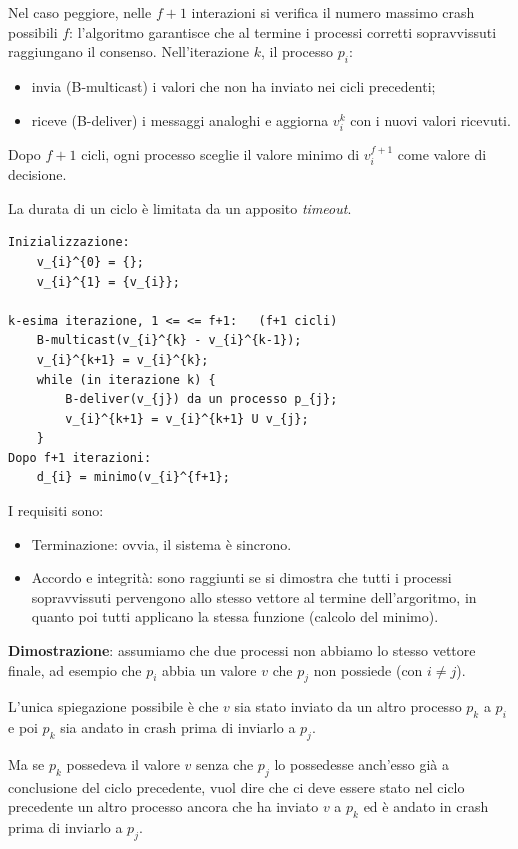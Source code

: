 Nel caso peggiore, nelle $f+1$ interazioni si verifica il numero massimo crash possibili $f$: l'algoritmo garantisce che al termine i processi corretti sopravvissuti raggiungano il consenso.
Nell'iterazione $k$, il processo $p_{i}$:
\begin{itemize}
    \item invia (B-multicast) i valori che non ha inviato nei cicli precedenti;
    \item riceve (B-deliver) i messaggi analoghi e aggiorna $v_{i}^{k}$ con i nuovi valori ricevuti.
\end{itemize}

Dopo $f+1$ cicli, ogni processo sceglie il valore minimo di $v_{i}^{f+1}$ come valore di decisione.

La durata di un ciclo è limitata da un apposito \textit{timeout}.

\vspace{5mm}

\begin{lstlisting}
Inizializzazione:
    v_{i}^{0} = {};
    v_{i}^{1} = {v_{i}};

k-esima iterazione, 1 <= <= f+1:   (f+1 cicli)
    B-multicast(v_{i}^{k} - v_{i}^{k-1});
    v_{i}^{k+1} = v_{i}^{k};
    while (in iterazione k) {
        B-deliver(v_{j}) da un processo p_{j};
        v_{i}^{k+1} = v_{i}^{k+1} U v_{j};
    }
Dopo f+1 iterazioni:
    d_{i} = minimo(v_{i}^{f+1};
\end{lstlisting}

\vspace{5mm}

I requisiti sono:
\begin{itemize}
    \item Terminazione: ovvia, il sistema è sincrono.
    \item Accordo e integrità: sono raggiunti se si dimostra che tutti i processi sopravvissuti pervengono allo stesso vettore al termine dell'argoritmo, in quanto poi tutti applicano la stessa funzione (calcolo del minimo).
\end{itemize}
\textbf{Dimostrazione}: assumiamo che due processi non abbiamo lo stesso vettore finale, ad esempio che $p_{i}$ abbia un valore $v$ che $p_{j}$ non possiede (con $i \neq j$).

L'unica spiegazione possibile è che $v$ sia stato inviato da un altro processo $p_{k}$ a $p_{i}$ e poi $p_{k}$ sia andato in crash prima di inviarlo a $p_{j}$.

Ma se $p_{k}$ possedeva il valore $v$ senza che $p_{j}$ lo possedesse anch'esso già a conclusione del ciclo precedente, vuol dire che ci deve essere stato nel ciclo precedente un altro processo ancora che ha inviato $v$ a $p_{k}$ ed è andato in crash prima di inviarlo a $p_{j}$.


